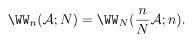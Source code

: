 \begin{equation}
\label{persemprescaling}
\WW_n({\cal A};N)=\WW_N(\frac{n}{N}{\cal A};n).
\end{equation}

